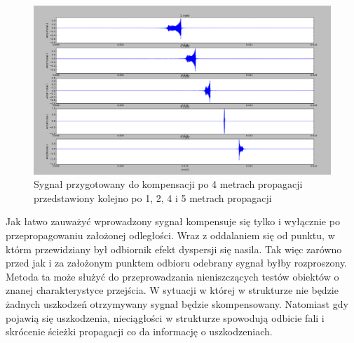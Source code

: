 \begin{figure}[h]
\centering
\includegraphics[width=14cm]{Zdjecia/4/porownanie_roznych_odleglosci_time_reversal}
\caption{Sygnał przygotowany do kompensacji po 4 metrach propagacji przedstawiony kolejno po 1, 2, 4 i 5 metrach propagacji}
\label{fig:rozne_odl}
\end{figure}

Jak łatwo zauważyć wprowadzony sygnał kompensuje się tylko i wyłącznie po przepropagowaniu założonej odległości. Wraz z oddalaniem się od punktu, w którm przewidziany był odbiornik efekt dyspersji się nasila. Tak więc zarówno przed jak i za założonym punktem odbioru odebrany sygnał byłby rozproszony. Metoda ta może służyć do przeprowadzania nieniszczących testów obiektów o znanej charakterystyce przejścia. W sytuacji w której w strukturze nie będzie żadnych uszkodzeń otrzymywany sygnał będzie skompensowany. Natomiast gdy pojawią się uszkodzenia, nieciągłości w strukturze spowodują odbicie fali i skrócenie ścieżki propagacji co da informację o uszkodzeniach. 

